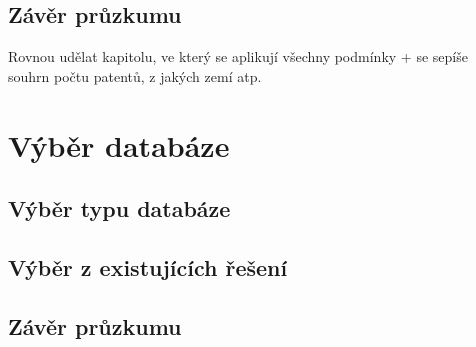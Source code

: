 \subsection{Závěr průzkumu}
Rovnou udělat kapitolu, ve který se aplikují všechny podmínky + se sepíše souhrn počtu patentů, z jakých zemí atp.


\section{Výběr databáze}
\subsection{Výběr typu databáze}
\subsection{Výběr z existujících řešení}
\subsection{Závěr průzkumu}